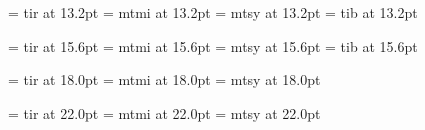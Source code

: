  \font\frtnrm  = tir	at 13.2pt		%
\font\frtnmi  = mtmi	at 13.2pt		%
    \skewchar{} 		%
\font\frtnsy  = mtsy	at 13.2pt		%
    \skewchar{}		%
 \font\frtnbf  = tib	at 13.2pt		%

 \font\svtnrm  = tir	at 15.6pt		%
\font\svtnmi  = mtmi	at 15.6pt		%
    \skewchar{} 		%
\font\svtnsy  = mtsy	at 15.6pt		%
    \skewchar{}		%
 \font\svtnbf  = tib	at 15.6pt		%

\font\twtyrm  = tir	at 18.0pt		%
\font\twtymi  = mtmi	at 18.0pt		%
    \skewchar{} 		%
\font\twtysy  = mtsy	at 18.0pt		%
    \skewchar{}		%

\font\twfvrm  = tir	at 22.0pt		%
\font\twfvmi  = mtmi	at 22.0pt		%
\font\twfvsy  = mtsy	at 22.0pt		%

